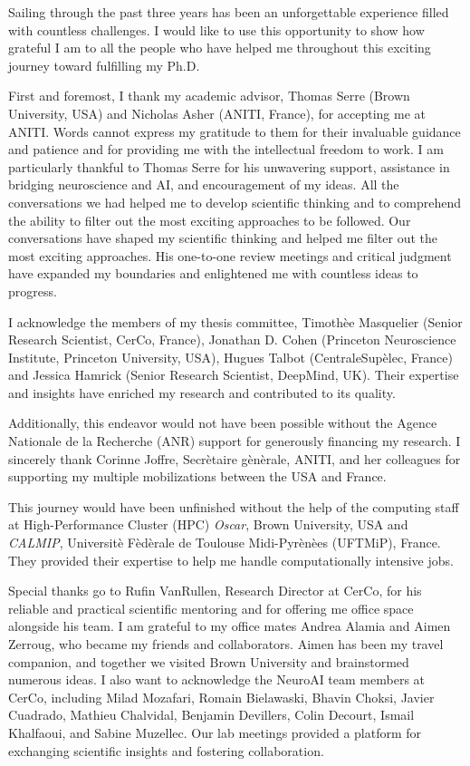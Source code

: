 
Sailing through the past three years has been an unforgettable experience filled with countless challenges. I would like to use this opportunity to show how grateful I am to all the people who have helped me throughout this exciting journey toward fulfilling my Ph.D.

First and foremost, I thank my academic advisor, Thomas Serre (Brown University, USA) and Nicholas Asher (ANITI, France), for accepting me at ANITI. Words cannot express my gratitude to them for their invaluable guidance and patience and for providing me with the intellectual freedom to work. I am particularly thankful to Thomas Serre for his unwavering support, assistance in bridging neuroscience and AI, and encouragement of my ideas. All the conversations we had helped me to develop scientific thinking and to comprehend the ability to filter out the most exciting approaches to be followed. Our conversations have shaped my scientific thinking and helped me filter out the most exciting approaches. His one-to-one review meetings and critical judgment have expanded my boundaries and enlightened me with countless ideas to progress. 

I acknowledge the members of my thesis committee, Timoth\`ee Masquelier (Senior Research Scientist, CerCo, France), Jonathan D. Cohen (Princeton Neuroscience Institute, Princeton University, USA), Hugues Talbot (CentraleSup\`elec, France) and Jessica Hamrick (Senior Research Scientist, DeepMind, UK). Their expertise and insights have enriched my research and contributed to its quality.

Additionally, this endeavor would not have been possible without the Agence Nationale de la Recherche (ANR) support for generously financing my research. I sincerely thank Corinne Joffre, Secr\`etaire g\`en\`erale, ANITI, and her colleagues for supporting my multiple mobilizations between the USA and France.

This journey would have been unfinished without the help of the computing staff at High-Performance Cluster (HPC) \textit{Oscar}, Brown University, USA and \textit{CALMIP}, Universit\`e F\`ed\`erale de Toulouse Midi-Pyr\`en\`ees (UFTMiP), France. They provided their expertise to help me handle computationally intensive jobs.

Special thanks go to Rufin VanRullen, Research Director at CerCo, for his reliable and practical scientific mentoring and for offering me office space alongside his team. I am grateful to my office mates Andrea Alamia and Aimen Zerroug, who became my friends and collaborators. Aimen has been my travel companion, and together we visited Brown University and brainstormed numerous ideas. I also want to acknowledge the NeuroAI team members at CerCo, including Milad Mozafari, Romain Bielawaski, Bhavin Choksi, Javier Cuadrado, Mathieu Chalvidal, Benjamin Devillers, Colin Decourt, Ismail Khalfaoui, and Sabine Muzellec. Our lab meetings provided a platform for exchanging scientific insights and fostering collaboration.

